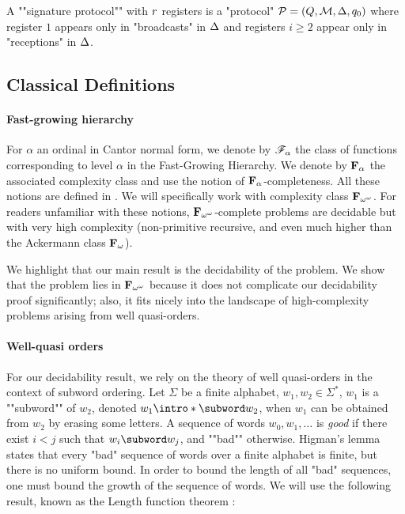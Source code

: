 \begin{definition}
A ""signature protocol"" with $r$ registers is a "protocol" $\mathcal{P} = (Q, \mathcal{M}, \Delta, q_0)$ where register $1$ appears only in "broadcasts" in $\Delta$ and registers $i \geq 2$ appear only in "receptions" in $\Delta$. 
\end{definition}

\subsection{Classical Definitions}


\paragraph*{Fast-growing hierarchy}

For $\alpha$ an ordinal in Cantor normal form, we denote by $\mathscr{F}_{\alpha}$ the class of functions corresponding to level $\alpha$ in the Fast-Growing Hierarchy. We denote by $\mathbf{F}_{\alpha}$ the associated complexity class and use the notion of $\mathbf{F}_{\alpha}$-completeness. All these notions are defined in \cite{Schmitz16}. We will specifically work with complexity class $\mathbf{F}_{\omega^{\omega}}$. For readers unfamiliar with these notions, $\mathbf{F}_{\omega^{\omega}}$-complete problems are decidable but with very high complexity (non-primitive recursive, and even much higher than the Ackermann class $\mathbf{F}_{\omega}$). 

We highlight that our main result is the decidability of the problem. We show that the problem lies in $\mathbf{F}_{\omega^{\omega}}$ because it does not complicate our decidability proof significantly; also, it fits nicely into the landscape of high-complexity problems arising from well quasi-orders. 

\paragraph*{Well-quasi orders}

For our decidability result, we rely on the theory of well quasi-orders in the context of subword ordering.
Let $\Sigma$ be a finite alphabet, $w_1, w_2 \in \Sigma^*$, $w_1$ is a ""subword"" of $w_2$, denoted $w_1 \intro*\subword w_2$, when $w_1$ can be obtained from $w_2$ by erasing some letters. 
A sequence of words $w_0, w_1, \ldots$ is \emph{good} if there exist $i<j$ such that $w_i \subword w_j$, and ""bad"" otherwise. Higman's lemma \cite{Higman52} states that every "bad" sequence of words over a finite alphabet is finite, but there is no uniform bound.
In order to bound the length of all "bad" sequences, one must bound the growth of the sequence of words. 
We will use the following result, known as the Length function theorem \cite{SchmitzS2011upperHigman}:

